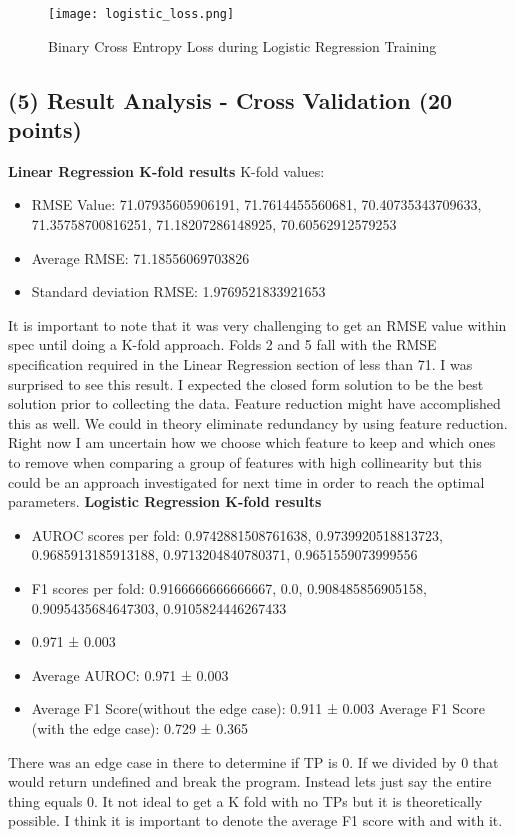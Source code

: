 \documentclass{article}
\begin{document}
\begin{figure}[h]
\centering
\texttt{[image: logistic\_loss.png]}
\caption{Binary Cross Entropy Loss during Logistic Regression Training}
\label{fig:logistic_loss}
\end{figure}
\vspace{5cm}


\subsection*{(5) Result Analysis - Cross Validation (20 points)}
\textbf{Linear Regression K-fold results}
K-fold values:
\begin{itemize}
\item RMSE Value: 71.07935605906191, 71.7614455560681, 70.40735343709633, 71.35758700816251, 71.18207286148925, 70.60562912579253
\item Average RMSE:  71.18556069703826
\item Standard deviation RMSE: 1.9769521833921653
\end{itemize}
It is important to note that it was very challenging to get an RMSE value within spec until doing a K-fold approach. Folds 2 and 5 fall with the RMSE specification required in the Linear Regression section of less than 71. I was surprised to see this result. I expected the closed form solution to be the best solution prior to collecting the data.  Feature reduction might have accomplished this as well. We could in theory eliminate redundancy by using feature reduction. Right now I am uncertain how we choose which feature to keep and which ones to remove when comparing a group of features with high collinearity but this could be an approach investigated for next time in order to reach the optimal parameters. 
\textbf{Logistic Regression K-fold results}
\begin{itemize}
\item AUROC scores per fold: 0.9742881508761638, 0.9739920518813723, 0.9685913185913188, 0.9713204840780371, 0.9651559073999556
\item F1 scores per fold: 0.9166666666666667, 0.0, 0.908485856905158, 0.9095435684647303, 0.9105824446267433
\item 0.971 ± 0.003
\item Average AUROC: 0.971 ± 0.003
\item Average F1 Score(without the edge case): 0.911 ± 0.003    Average F1 Score (with the edge case): 0.729 ± 0.365 
\end{itemize}
There was an edge case in there to determine if TP is 0. If we divided by 0 that would return undefined and break the program. Instead lets just say the entire thing equals 0. It not ideal to get a K fold with no TPs but it is theoretically possible. I think it is important to denote the average F1 score with and with it. 
\end{document}
